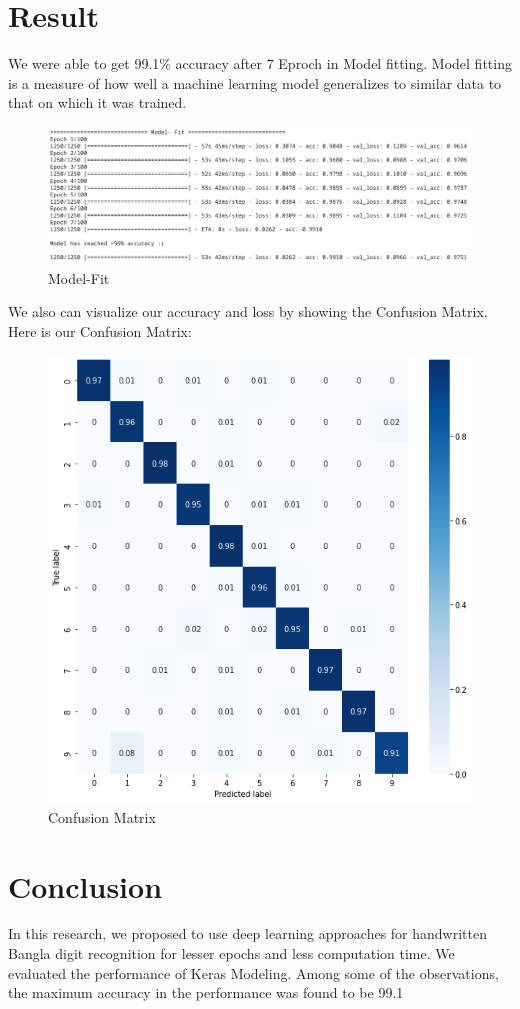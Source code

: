 \documentclass[conference]{IEEEtran}
\begin{document}
\section{Result}

We were able to get 99.1\% accuracy after 7 Eproch in Model fitting. Model fitting is a measure of how well a machine learning model generalizes to similar data to that on which it was trained.

\begin{figure}[htbp]
\centerline{\includegraphics[scale=.2]{fig5.png}}
\caption{Model-Fit}
\label{fig5}
\end{figure}

We also can visualize our accuracy and loss by showing the Confusion Matrix. Here is our Confusion Matrix:


\begin{figure}[htbp]
\centerline{\includegraphics[scale=.39]{fig6.png}}
\caption{Confusion Matrix}
\label{fig6}
\end{figure}


\section{Conclusion}
In this research, we proposed to use deep learning approaches for handwritten Bangla digit recognition for lesser epochs and less computation time. We evaluated the performance of Keras Modeling. Among some of the observations, the maximum accuracy in the performance was found to be 99.1%


\printbibliography
\end{document}
